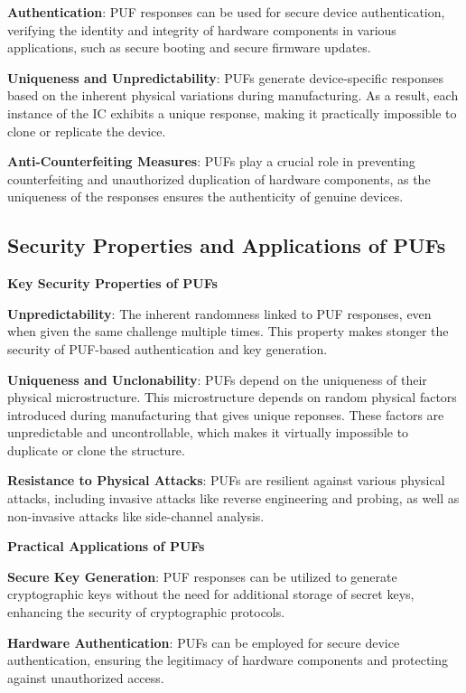 \documentclass{article}
\begin{document}
\textbf{Authentication}: PUF responses can be used for secure device authentication, verifying the identity and integrity of hardware components in various applications, such as secure booting and secure firmware updates.



\textbf{Uniqueness and Unpredictability}: PUFs generate device-specific responses based on the inherent physical variations during manufacturing. As a result, each instance of the IC exhibits a unique response, making it practically impossible to clone or replicate the device.

\textbf{Anti-Counterfeiting Measures}: PUFs play a crucial role in preventing counterfeiting and unauthorized duplication of hardware components, as the uniqueness of the responses ensures the authenticity of genuine devices.

\subsection{Security Properties and Applications of PUFs}
\textbf{Key Security Properties of PUFs}


\textbf{Unpredictability}: The inherent randomness linked to  PUF responses, even when given the same challenge multiple times. This property makes stonger the security of PUF-based authentication and key generation.


\textbf{Uniqueness and Unclonability}: PUFs depend on the uniqueness of their physical microstructure. This microstructure depends on random physical factors introduced during manufacturing that gives unique reponses. These factors are unpredictable and uncontrollable, which makes it virtually impossible to duplicate or clone the structure.


\textbf{Resistance to Physical Attacks}: PUFs are resilient against various physical attacks, including invasive attacks like reverse engineering and probing, as well as non-invasive attacks like side-channel analysis.


\textbf{Practical Applications of PUFs}


\textbf{Secure Key Generation}: PUF responses can be utilized to generate cryptographic keys without the need for additional storage of secret keys, enhancing the security of cryptographic protocols.


\textbf{Hardware Authentication}: PUFs can be employed for secure device authentication, ensuring the legitimacy of hardware components and protecting against unauthorized access.
\end{document}
